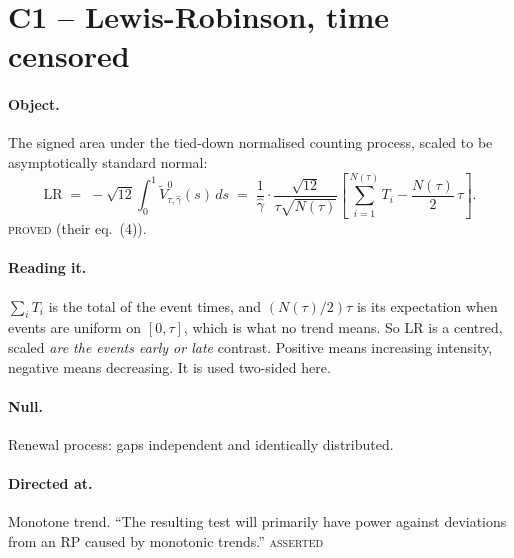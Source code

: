 \documentclass[11pt,a4paper]{article}
\newcommand{\Vtilde}{\widetilde{V}^{0}_{\tau,\hat\gamma}}
\newcommand{\gh}{\hat\gamma}
\newcommand{\Ntau}{N(\tau)}
\newcommand{\PROVED}{\textsc{\textcolor{blue!55!black}{proved}}}
\newcommand{\ASSERTED}{\textsc{\textcolor{purple!70!black}{asserted}}}
\begin{document}
\section{C1 -- Lewis-Robinson, time censored}

\paragraph{Object.} The signed area under the tied-down normalised counting process,
scaled to be asymptotically standard normal:
%
\begin{equation}
\mathrm{LR} \;=\; -\sqrt{12}\int_0^1 \Vtilde(s)\,ds
\;=\; \frac{1}{\gh}\cdot\frac{\sqrt{12}}{\tau\sqrt{\Ntau}}
\left[\sum_{i=1}^{\Ntau} T_i - \frac{\Ntau}{2}\,\tau\right].
\label{eq:lr}
\end{equation}
\PROVED{} (their eq.~(4)).

\paragraph{Reading it.} $\sum_i T_i$ is the total of the event times, and
$(\Ntau/2)\tau$ is its expectation when events are uniform on $[0,\tau]$, which is what
no trend means. So LR is a centred, scaled \emph{are the events early or late}
contrast. Positive means increasing intensity, negative means decreasing. It is used
two-sided here.

\paragraph{Null.} Renewal process: gaps independent and identically distributed.

\paragraph{Directed at.} Monotone trend. \enquote{The resulting test will primarily have
power against deviations from an RP caused by monotonic trends.} \ASSERTED
\end{document}
